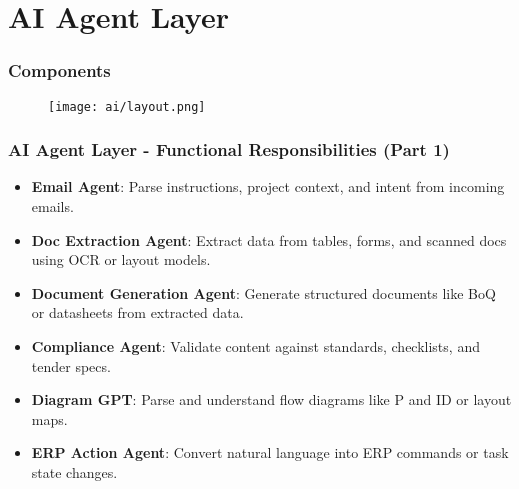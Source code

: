 \section{AI Agent Layer}

\begin{frame}
    \frametitle{Components}
    \begin{figure}
        \centering
        \texttt{[image: ai/layout.png]} %
        \caption{}
    \end{figure}
\end{frame}




\begin{frame}
    \frametitle{AI Agent Layer - Functional Responsibilities (Part 1)}
    \begin{itemize}
        \item \textbf{Email Agent}: Parse instructions, project context, and intent from incoming emails.
        \item \textbf{Doc Extraction Agent}: Extract data from tables, forms, and scanned docs using OCR or layout models.
        \item \textbf{Document Generation Agent}: Generate structured documents like BoQ or datasheets from extracted data.
        \item \textbf{Compliance Agent}: Validate content against standards, checklists, and tender specs.
        \item \textbf{Diagram GPT}: Parse and understand flow diagrams like P and ID or layout maps.
        \item \textbf{ERP Action Agent}: Convert natural language into ERP commands or task state changes.
    \end{itemize}
\end{frame}

